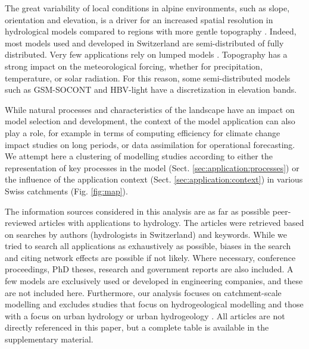 \documentclass[10pt,a4paper]{article}
\begin{document}
The great variability of local conditions in alpine environments, such as slope, orientation and elevation, is a driver for an increased spatial resolution in hydrological models compared to regions with more gentle topography \citep{Gurtz2003}. Indeed, most models used and developed in Switzerland are semi-distributed of fully distributed. Very few applications rely on lumped models \citep[for example,][]{Keller2019a}. Topography has a strong impact on the meteorological forcing, whether for precipitation, temperature, or solar radiation. For this reason, some semi-distributed models such as GSM-SOCONT and HBV-light have a discretization in elevation bands.

While natural processes and characteristics of the landscape have an impact on model selection and development, the context of the model application can also play a role, for example in terms of computing efficiency for climate change impact studies on long periods, or data assimilation for operational forecasting. We attempt here a clustering of modelling studies according to either the representation of key processes in the model (Sect. \ref{sec:application:processes}) or the influence of the application context (Sect. \ref{sec:application:context}) in various Swiss catchments (Fig. \ref{fig:map}).

The information sources considered in this analysis are as far as possible peer-reviewed articles with applications to hydrology. The articles were retrieved based on searches by authors (hydrologists in Switzerland) and keywords. While we tried to search all applications as exhaustively as possible, biases in the search and citing network effects are possible if not likely. Where necessary, conference proceedings, PhD theses, research and government reports are also included. A few models are exclusively used or developed in engineering companies, and these are not included here. Furthermore, our analysis focuses on catchment-scale modelling and excludes studies that focus on hydrogeological modelling \citep{Carlier2019} and those with a focus on urban hydrology \citep{Peleg2017} or urban hydrogeology \citep{Schirmer2013}. All articles are not directly referenced in this paper, but a complete table is available in the supplementary material.
\end{document}
